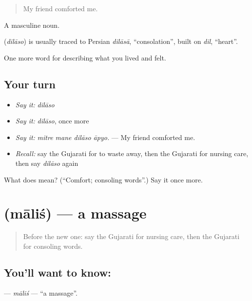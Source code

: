 \begin{quote}
My friend comforted me.
\end{quote}

A masculine noun.

\begin{cousinweb}
\textbf{} (\emph{dilāso}) is usually traced to Persian \emph{dilāsā}, \textquotedblleft{}consolation\textquotedblright{}, built on \emph{dil}, \textquotedblleft{}heart\textquotedblright{}.
\end{cousinweb}

\begin{grammarlens}[title={What you've built}]
One more word for describing what you lived and felt.
\end{grammarlens}

\subsection*{Your turn}
\begin{itemize}
\raggedright
  \item \emph{Say it:} \emph{dilāso}
  \item \emph{Say it:} \emph{dilāso}, once more
  \item \emph{Say it:} \emph{mitre mane dilāso āpyo.} — My friend comforted me.
  \item \emph{Recall:} say the Gujarati for to waste away, then the Gujarati for nursing care, then say \emph{dilāso} again
\end{itemize}

\begin{tcolorbox}[breakable,colback=teal!4,colframe=teal!35!black,title={Before you move on}]
What does  mean? (\textquotedblleft{}Comfort; consoling words\textquotedblright{}.) Say it once more.
\end{tcolorbox}
\section[\texorpdfstring{\gu{માલિશ} (māliś)}{માલિશ (māliś)}]{ (māliś) — a massage}

\label{lesson:GU-C487-malis}



\begin{quote}
Before the new one: say the Gujarati for nursing care, then the Gujarati for consoling words.
\end{quote}

\subsection*{You'll want to know: }
\textbf{} — \emph{māliś} — \textquotedblleft{}a massage\textquotedblright{}.

